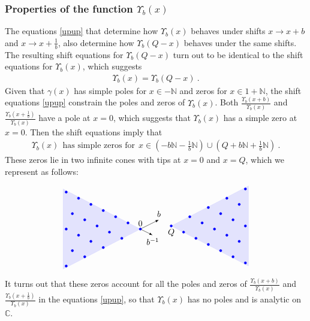 \documentclass[12pt, a4paper, notitlepage, twoside]{report}
\numberwithin{equation}{section}
\theoremstyle{break}
\begin{document}
\subsubsection{Properties of the function $\Upsilon_b(x)$}

The equations \eqref{upup} that determine how $\Upsilon_b(x)$ behaves under shifts $x\to x+b$ and $x\to x+\frac{1}{b}$, also determine how $\Upsilon_b(Q-x)$ behaves under the same shifts.
The resulting shift equations for $\Upsilon_b(Q-x)$ turn out to be identical to the shift equations for $\Upsilon_b(x)$, which suggests 
\begin{align}
 \boxed{\Upsilon_b(x) = \Upsilon_b(Q-x)}\ .
\label{upq}
\end{align}
Given that $\gamma(x)$ has simple poles for $x\in -{\mathbb{N}}$ and zeros for $x\in 1+{\mathbb{N}}$, the shift equations \eqref{upup} constrain the poles and zeros of  $\Upsilon_b(x)$.
Both $\frac{\Upsilon_b(x+b)}{\Upsilon_b(x)}$ and $\frac{\Upsilon_b(x+\frac{1}{b})}{\Upsilon_b(x)}$ have a pole at $x=0$, which suggests that $\Upsilon_b(x)$ has a simple zero at $x=0$.
Then the shift equations imply that 
\begin{align}
 \boxed{\Upsilon_b(x)\ \ \text{has simple zeros for}\ \ x\in  \left(-b{\mathbb{N}} -\tfrac{1}{b}{\mathbb{N}} \right) \cup \left( Q+b{\mathbb{N}} + \tfrac{1}{b}{\mathbb{N}}\right)} \ .
\label{xbn}
\end{align}
These zeros lie in two infinite cones with tips at $x=0$ and $x=Q$, which we represent as follows:
\begin{align}
\begin{tikzpicture}[scale = 1.3, baseline=(current  bounding  box.center)]
\node[above] at (0, 0) {$0$};
\node[below] at (1, .1) {$Q$};
\draw [latex-latex] (.6, .3) node[above] {$b$} -- (0, 0) -- (.4, -.2) node[below] {$b^{-1}$};
\begin{scope}[rotate = 90]
\filldraw[blue, opacity = .1] (0,0) -- (-1.3, 2.5) -- (1.3, 2.5) -- cycle;
\clip (-1.4, -.2) -- (1.4, -.2) -- (1.4, 2.5) -- (-1.4, 2.5) -- cycle;
\foreach \x in {0, 1,...,4}{
  \foreach \y in {0, 1,...,6}{
    \node[draw,circle,inner sep=1pt,fill,blue] at (-.3*\x +.2*\y, .6*\x +.4*\y) {};
  }}
  \end{scope}
\begin{scope}[shift = {(1, .1)}, rotate = -90]
\filldraw[blue, opacity = .1] (0,0) -- (-1.3, 2.5) -- (1.3, 2.5) -- cycle;
\clip (-1.4, -.2) -- (1.4, -.2) -- (1.4, 2.5) -- (-1.4, 2.5) -- cycle;
\foreach \x in {0, 1,...,4}{
  \foreach \y in {0, 1,...,6}{
    \node[draw,circle,inner sep=1pt,fill,blue] at (-.3*\x +.2*\y, .6*\x +.4*\y) {};
  }}  
\end{scope}  
 \end{tikzpicture}
\label{lines}
\end{align}
It turns out that these zeros account for all the poles and zeros of $\frac{\Upsilon_b(x+b)}{\Upsilon_b(x)}$ and $\frac{\Upsilon_b(x+\frac{1}{b})}{\Upsilon_b(x)}$ in the equations \eqref{upup}, so that $\Upsilon_b(x)$ has no poles and is analytic on ${\mathbb{C}}$. 
\end{document}
